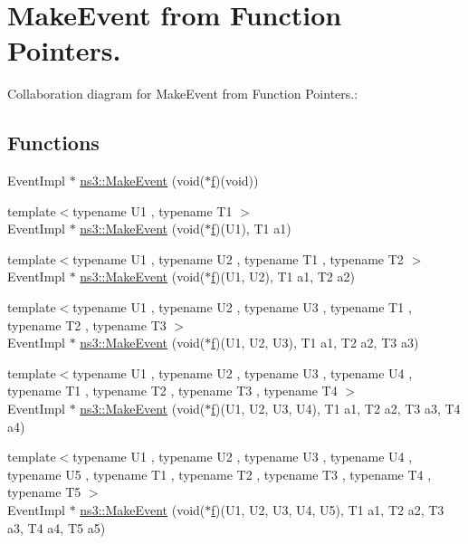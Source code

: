\hypertarget{group__makeeventfnptr}{}\section{Make\+Event from Function Pointers.}
\label{group__makeeventfnptr}
Collaboration diagram for Make\+Event from Function Pointers.\+:
\subsection*{Functions}
\begin{DoxyCompactItemize}
\item 
Event\+Impl $\ast$ \hyperlink{group__makeeventfnptr_ga289a28a2497c18a9bd299e5e2014094b}{ns3\+::\+Make\+Event} (void($\ast$\hyperlink{80211b_8c_ae7ffc1a8f84fa47a0812b2f2b9627132}{f})(void))
\item 
{\footnotesize template$<$typename U1 , typename T1 $>$ }\\Event\+Impl $\ast$ \hyperlink{group__makeeventfnptr_ga77719a993ef7956d37a08a121a935074}{ns3\+::\+Make\+Event} (void($\ast$\hyperlink{80211b_8c_ae7ffc1a8f84fa47a0812b2f2b9627132}{f})(U1), T1 a1)
\item 
{\footnotesize template$<$typename U1 , typename U2 , typename T1 , typename T2 $>$ }\\Event\+Impl $\ast$ \hyperlink{group__makeeventfnptr_gadce4336b09c86b3f7ed8da03859375ba}{ns3\+::\+Make\+Event} (void($\ast$\hyperlink{80211b_8c_ae7ffc1a8f84fa47a0812b2f2b9627132}{f})(U1, U2), T1 a1, T2 a2)
\item 
{\footnotesize template$<$typename U1 , typename U2 , typename U3 , typename T1 , typename T2 , typename T3 $>$ }\\Event\+Impl $\ast$ \hyperlink{group__makeeventfnptr_ga56dc5a484a0cf8bc6e42dbb01af7edfa}{ns3\+::\+Make\+Event} (void($\ast$\hyperlink{80211b_8c_ae7ffc1a8f84fa47a0812b2f2b9627132}{f})(U1, U2, U3), T1 a1, T2 a2, T3 a3)
\item 
{\footnotesize template$<$typename U1 , typename U2 , typename U3 , typename U4 , typename T1 , typename T2 , typename T3 , typename T4 $>$ }\\Event\+Impl $\ast$ \hyperlink{group__makeeventfnptr_gafd43cc9c6606afb312d7781cca544cbc}{ns3\+::\+Make\+Event} (void($\ast$\hyperlink{80211b_8c_ae7ffc1a8f84fa47a0812b2f2b9627132}{f})(U1, U2, U3, U4), T1 a1, T2 a2, T3 a3, T4 a4)
\item 
{\footnotesize template$<$typename U1 , typename U2 , typename U3 , typename U4 , typename U5 , typename T1 , typename T2 , typename T3 , typename T4 , typename T5 $>$ }\\Event\+Impl $\ast$ \hyperlink{group__makeeventfnptr_gaa6a1fb3f6bd167d89e3581ae25bd1e93}{ns3\+::\+Make\+Event} (void($\ast$\hyperlink{80211b_8c_ae7ffc1a8f84fa47a0812b2f2b9627132}{f})(U1, U2, U3, U4, U5), T1 a1, T2 a2, T3 a3, T4 a4, T5 a5)

\end{DoxyCompactItemize}
